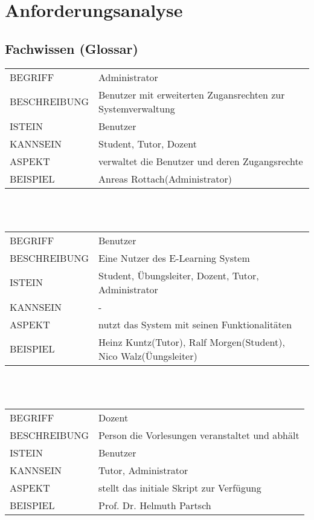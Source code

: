 \documentclass[12pt,a4paper]{article}
\begin{document}
\section{Anforderungsanalyse}
\subsection{Fachwissen (Glossar)}
\begin{tabular}{l p{10cm}}  
BEGRIFF 	 & Administrator \\ 
BESCHREIBUNG & Benutzer mit erweiterten Zugansrechten zur Systemverwaltung\\ 
ISTEIN   	 & Benutzer \\
KANNSEIN 	 & Student, Tutor, Dozent \\ 
ASPEKT   	 & verwaltet die Benutzer und deren Zugangsrechte\\
BEISPIEL 	 & Anreas Rottach(Administrator)\\
\hline
\end{tabular}\\\\  

\begin{tabular}{l p{10cm}}
BEGRIFF 	 & Benutzer \\ 
BESCHREIBUNG & Eine Nutzer des E-Learning System \\ 
ISTEIN   	 & Student, Übungsleiter, Dozent, Tutor, Administrator \\
KANNSEIN 	 &   - \\ 
ASPEKT   	 & nutzt das System mit seinen Funktionalitäten\\
BEISPIEL 	 & Heinz Kuntz(Tutor), Ralf Morgen(Student), Nico Walz(Üungsleiter)\\
\hline
\end{tabular}\\\\    

\begin{tabular}{l p{10cm}}
BEGRIFF 	 & Dozent \\ 
BESCHREIBUNG & Person die Vorlesungen veranstaltet und abhält \\ 
ISTEIN   	 & Benutzer\\
KANNSEIN 	 & Tutor, Administrator \\ 
ASPEKT   	 & stellt das initiale Skript zur Verfügung\\
BEISPIEL 	 & Prof. Dr. Helmuth Partsch\\
\hline
\end{tabular}\\\\   
\end{document}
